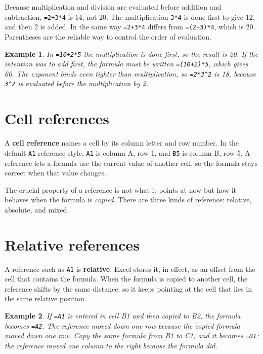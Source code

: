 \documentclass[11pt]{article}
\newtheorem{example}{Example}[section]
\begin{document}
Because multiplication and division are evaluated before addition and
subtraction, \texttt{=2+3*4} is 14, not 20. The multiplication \texttt{3*4} is
done first to give 12, and then 2 is added. In the same way
\texttt{=2+3*4} differs from \texttt{=(2+3)*4}, which is 20. Parentheses are
the reliable way to control the order of evaluation.

\begin{example}
In \texttt{=10+2*5} the multiplication is done first, so the result is 20. If
the intention was to add first, the formula must be written
\texttt{=(10+2)*5}, which gives 60. The exponent binds even tighter than
multiplication, so \texttt{=2*3\textasciicircum2} is 18, because
\texttt{3\textasciicircum2} is evaluated before the multiplication by 2.
\end{example}

\section{Cell references}
A \textbf{cell reference} names a cell by its column letter and row number. In
the default \texttt{A1} reference style, \texttt{A1} is column A, row 1, and
\texttt{B5} is column B, row 5. A reference lets a formula use the current
value of another cell, so the formula stays correct when that value changes.

The crucial property of a reference is not what it points at now but how it
behaves when the formula is \emph{copied}. There are three kinds of
reference: relative, absolute, and mixed.

\section{Relative references}
A reference such as \texttt{A1} is \textbf{relative}. Excel stores it, in
effect, as an offset from the cell that contains the formula. When the formula
is copied to another cell, the reference shifts by the same distance, so it
keeps pointing at the cell that lies in the same relative position.

\begin{example}
If \texttt{=A1} is entered in cell B1 and then copied to B2, the formula
becomes \texttt{=A2}. The reference moved down one row because the copied
formula moved down one row. Copy the same formula from B1 to C1, and it
becomes \texttt{=B1}: the reference moved one column to the right because the
formula did.
\end{example}
\end{document}
